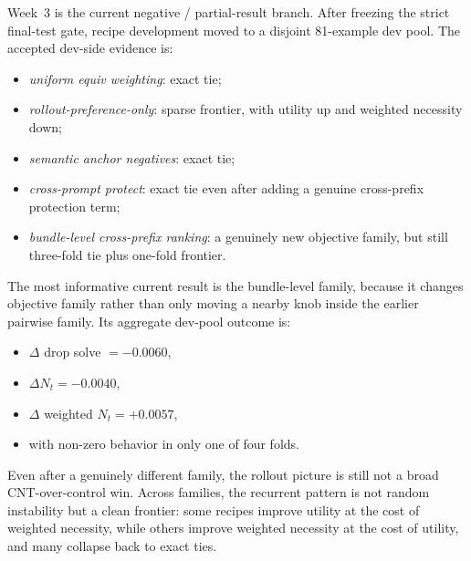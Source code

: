 Week~3 is the current negative / partial-result branch. After freezing the strict final-test gate, recipe development moved to a disjoint 81-example dev pool. The accepted dev-side evidence is:

\begin{itemize}
  \item \emph{uniform equiv weighting}: exact tie;
  \item \emph{rollout-preference-only}: sparse frontier, with utility up and weighted necessity down;
  \item \emph{semantic anchor negatives}: exact tie;
  \item \emph{cross-prompt protect}: exact tie even after adding a genuine cross-prefix protection term;
  \item \emph{bundle-level cross-prefix ranking}: a genuinely new objective family, but still three-fold tie plus one-fold frontier.
\end{itemize}

The most informative current result is the bundle-level family, because it changes objective family rather than only moving a nearby knob inside the earlier pairwise family. Its aggregate dev-pool outcome is:

\begin{itemize}
  \item $\Delta$ drop solve $= -0.0060$,
  \item $\Delta N_t = -0.0040$,
  \item $\Delta$ weighted $N_t = +0.0057$,
  \item with non-zero behavior in only one of four folds.
\end{itemize}

Even after a genuinely different family, the rollout picture is still not a broad CNT-over-control win. Across families, the recurrent pattern is not random instability but a clean frontier: some recipes improve utility at the cost of weighted necessity, while others improve weighted necessity at the cost of utility, and many collapse back to exact ties.

